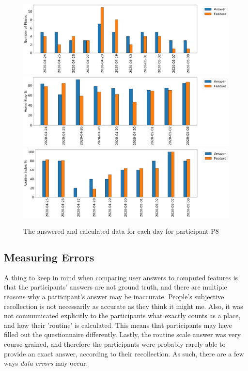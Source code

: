 \begin{figure}[h]
    \centering
    \includegraphics[width=\textwidth]{images/study/places_ec110976-0192-436d-b451-4f5dd97e71d8.png}
    \includegraphics[width=\textwidth]{images/study/homestay_ec110976-0192-436d-b451-4f5dd97e71d8.png}
    \includegraphics[width=\textwidth]{images/study/routine_ec110976-0192-436d-b451-4f5dd97e71d8.png}
    \caption{The answered and calculated data for each day for participant P8}
    \label{fig:plot-p8-features}
\end{figure}


\subsection{Measuring Errors}
A thing to keep in mind when comparing user answers to computed features is that the participants' answers are not ground truth, and there are multiple reasons why a participant's answer may be inaccurate. People's subjective recollection is not necessarily as accurate as they think it might me. Also, it was not communicated explicitly to the participants what exactly counts as a place, and how their 'routine' is calculated. This means that participants may have filled out the questionnaire differently. Lastly, the routine scale answer was very course-grained, and therefore the participants were probably rarely able to provide an exact answer, according to their recollection. As such, there are a few ways \textit{data errors} may occur:


